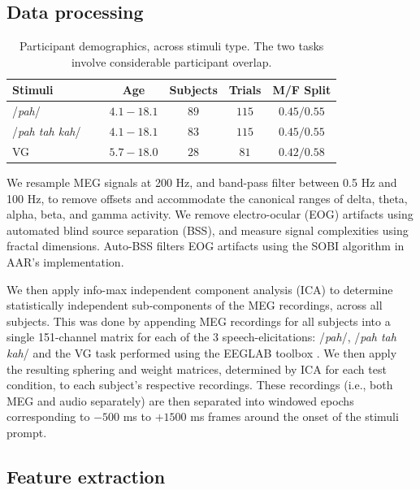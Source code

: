 \documentclass[a4paper]{article}
\begin{document}
\subsection{Data processing}

\begin{table}[t]
  \caption{Participant demographics, across stimuli type. The two tasks involve considerable participant overlap.}
  \label{tab:subjects}
  \centering
  \begin{tabular}{ l@{}c c c c }
    \toprule
    \multicolumn{1}{l}{\textbf{Stimuli}} & \multicolumn{1}{c}{\textbf{Age}} & \multicolumn{1}{c}{\textbf{Subjects}} & \multicolumn{1}{c}{\textbf{Trials}}  & \multicolumn{1}{c}{\textbf{M/F Split}} \\
    \midrule
    /{\em pah}/~~~                    & $4.1-18.1$   &   $89$   &   $115$   &   $0.45/0.55$ \\
    /{\em pah tah kah}/~~~            & $4.1-18.1$   &   $83$   &   $115$   &   $0.45/0.55$ \\
    VG~~~                             & $5.7-18.0$   &   $28$   &   $81$    &   $0.42/0.58$  \\
    \bottomrule
  \end{tabular}
\end{table}

We resample MEG signals at 200 Hz, and band-pass filter between 0.5 Hz and 100 Hz, to remove offsets and accommodate the canonical ranges of delta, theta, alpha, beta, and gamma activity. We remove electro-ocular (EOG) artifacts using automated blind source separation (BSS), and measure  signal complexities using fractal dimensions. Auto-BSS filters EOG artifacts using the SOBI algorithm in AAR's implementation.

We then apply info-max independent component analysis (ICA) \cite{Bell1995} to determine statistically independent sub-components of the MEG recordings, across all subjects. This was done by appending MEG recordings for all subjects into a single 151-channel matrix for each of the 3 speech-elicitations: /{\em pah}/, /{\em pah tah kah}/ and the VG task performed using the EEGLAB toolbox \cite{Delorme04eeglab}. We then apply the resulting sphering and weight matrices, determined by ICA for each test condition, to each subject's respective recordings. These recordings (i.e., both MEG and audio separately) are then separated into windowed epochs corresponding to $-500$ ms to $+1500$ ms frames around the onset of the stimuli prompt.

\subsection{Feature extraction}
\end{document}
